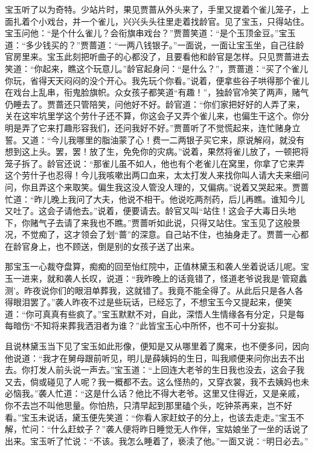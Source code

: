 \documentclass[12pt,oneside]{book}
\begin{document}
宝玉听了以为奇特。少站片时，果见贾蔷从外头来了，手里又提着个雀儿笼子，上面扎着个小戏台，并一个雀儿，兴兴头头往里走着找龄官。见了宝玉，只得站住。宝玉问他：“是个什么雀儿？会衔旗串戏台？”贾蔷笑道：“是个玉顶金豆。”宝玉道：“多少钱买的？”贾蔷道：“一两八钱银子。”一面说，一面让宝玉坐，自己往龄官房里来。宝玉此刻把听曲子的心都没了，且要看他和龄官是怎样。只见贾蔷进去笑道：“你起来，瞧这个玩意儿。”龄官起身问：“是什么？”，贾蔷道：“买了个雀儿你玩，省得天天闷闷的没个开心。我先玩个你看。”说着，便拿些谷子哄得那个雀儿在戏台上乱串，衔鬼脸旗帜。众女孩子都笑道“有趣！”，独龄官冷笑了两声，赌气仍睡去了。贾蔷还只管陪笑，问他好不好。龄官道：“你们家把好好的人弄了来，关在这牢坑里学这个劳什子还不算，你这会子又弄个雀儿来，也偏生干这个。你分明是弄了它来打趣形容我们，还问我好不好。”贾蔷听了不觉慌起来，连忙赌身立誓。又道：“今儿我哪里的脂油蒙了心！费一二两银子买它来，原说解闷，就没有想到这上头。罢，罢！放了生，免免你的灾病。”说着，果然将雀儿放了，一顿把将笼子拆了。龄官还说：“那雀儿虽不如人，他也有个老雀儿在窝里，你拿了它来弄这个劳什子也忍得！今儿我咳嗽出两口血来，太太打发人来找你叫人请大夫来细问问，你且弄这个来取笑。偏生我这没人管没人理的，又偏病。”说着又哭起来。贾蔷忙道：“昨儿晚上我问了大夫，他说不相干。他说吃两剂药，后儿再瞧。谁知今儿又吐了。这会子请他去。”说着，便要请去。龄官又叫“站住！这会子大毒日头地下，你赌气子去请了来我也不瞧。”贾蔷听如此说，只得又站住。宝玉见了这般景况，不觉痴了，这才领会了划“蔷”的深意。自己站不住，也抽身走了。贾蔷一心都在龄官身上，也不顾送，倒是别的女孩子送了出来。

那宝玉一心裁夺盘算，痴痴的回至怡红院中，正值林黛玉和袭人坐着说话儿呢。宝玉一进来，就和袭人长叹，说道：“我昨晚上的话竟错了，怪道老爷说我是‘管窥蠡测’。昨夜说你们的眼泪单葬我，这就错了。我竟不能全得了。从此后只是各人各得眼泪罢了。”袭人昨夜不过是些玩话，已经忘了，不想宝玉今又提起来，便笑道：“你可真真有些疯了。”宝玉默默不对，自此，深悟人生情缘各有分定，只是每每暗伤“不知将来葬我洒泪者为谁？”此皆宝玉心中所怀，也不可十分妄拟。

且说林黛玉当下见了宝玉如此形像，便知是又从哪里着了魔来，也不便多问，因向他说道：“我才在舅母跟前听见，明儿是薛姨妈的生日，叫我顺便来问你出去不出去。你打发人前头说一声去。”宝玉道：“上回连大老爷的生日我也没去，这会子我又去，倘或碰见了人呢？我一概都不去。这么怪热的，又穿衣裳，我不去姨妈也未必恼我。”袭人忙道：“这是什么话？他比不得大老爷。这里又住得近，又是亲戚，你不去岂不叫他思量。你怕热，只清早起到那里磕个头，吃钟茶再来，岂不好看。”宝玉未说话，黛玉便先笑道：“你看人家赶蚊子的分上，也该去走走。”宝玉不解，忙问：“什么赶蚊子？”袭人便将昨日睡觉无人作伴，宝姑娘坐了一坐的话说了出来。宝玉听了忙说：“不该。我怎么睡着了，亵渎了他。”一面又说：“明日必去。”
\end{document}
